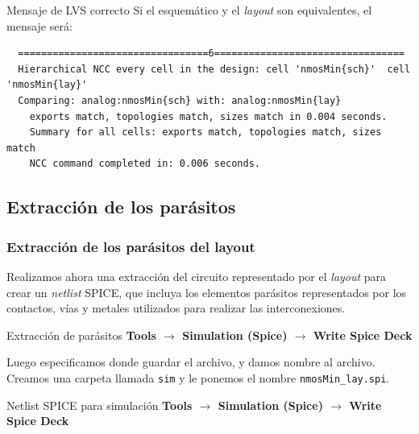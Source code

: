 \documentclass{beamer}
\begin{document}
\begin{frame}[fragile]{Mensaje de LVS correcto}
  Si el esquemático y el \emph{layout} son equivalentes, el mensaje será:
  \begin{tiny}
  \begin{verbatim}
  =================================6=================================
  Hierarchical NCC every cell in the design: cell 'nmosMin{sch}'  cell 'nmosMin{lay}'
  Comparing: analog:nmosMin{sch} with: analog:nmosMin{lay}
    exports match, topologies match, sizes match in 0.004 seconds.
    Summary for all cells: exports match, topologies match, sizes match
    NCC command completed in: 0.006 seconds.
  \end{verbatim}
\end{tiny}
\end{frame}
\subsection{Extracción de los parásitos}
\begin{frame}[fragile]
\frametitle{Extracción de los parásitos del layout}
Realizamos ahora una extracción del circuito representado por el \emph{layout} para crear un \emph{netlist} SPICE, que incluya los elementos parásitos representados por los contactos, vías y metales utilizados para realizar las interconexiones.

\begin{exampleblock}{Extracción de parásitos}
\textbf{
Tools $\rightarrow$ Simulation (Spice) $\rightarrow$ Write Spice Deck
}
\end{exampleblock}


Luego especificamos donde guardar el archivo, y damos nombre al archivo. Creamos una carpeta llamada \verb.sim. y le ponemos el nombre \verb(nmosMin_lay.spi(.

\begin{exampleblock}{Netlist SPICE para simulación}
\textbf{
Tools $\rightarrow$ Simulation (Spice) $\rightarrow$ Write Spice Deck
}
\end{exampleblock}


\end{frame}
\end{document}
